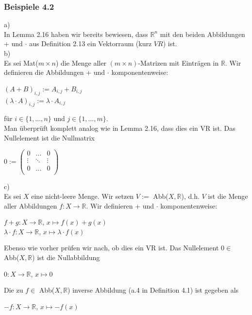 \documentclass{article}
\begin{document}
\subsubsection*{Beispiele 4.2}
a) \\
In Lemma 2.16 haben wir bereits bewiesen, dass $\mathbb{R}^n$ mit den beiden Abbildungen + und $\cdot$ aus Definition 2.13 ein Vektorraum (kurz $\textit{VR}$) ist. \\
b) \\
Es sei Mat($m \times n$) die Menge aller $(m \times n)$-Matrizen mit Einträgen in $\mathbb{R}$. Wir definieren die Abbildungen + und $\cdot$ komponentenweise: \\
\begin{center}
    $(A+B)_{i,j} := A_{i,j} + B_{i,j}$ \\
    $(\lambda \cdot A)_{i,j} := \lambda \cdot A_{i,j}$ \\
\end{center}
für $i \in \{1,...,n\}$ und $j \in \{1,...,m\}$. \\
Man überprüft komplett analog wie in Lemma 2.16, dass dies ein VR ist. Das Nullelement ist die Nullmatrix \\
\begin{center}
    $0 := \begin{pmatrix}
        0 & ... & 0 \\
        \vdots & \ddots & \vdots \\
        0 & ... & 0 \\
    \end{pmatrix}$ \\
\end{center}
c) \\
Es sei $X$ eine nicht-leere Menge. Wir setzen $V := $ Abb($X, \mathbb{R}$), d.h. $V$ ist die Menge aller Abbildungen $f: X \rightarrow \mathbb{R}$. Wir definieren + und $\cdot$ komponentenweise: \\
\begin{center}
    $f+g: X \rightarrow \mathbb{R}$, $x \mapsto f(x)+g(x)$ \\
    $\lambda \cdot f: X \rightarrow \mathbb{R}$, $x \mapsto \lambda \cdot f(x)$ \\
\end{center}
Ebenso wie vorher prüfen wir nach, ob dies ein VR ist. Das Nullelement $ 0 \in$ Abb($X, \mathbb{R}$) ist die Nullabbildung \\
\begin{center}
    $0: X \rightarrow \mathbb{R}$, $x \mapsto 0$ \\
\end{center}
Die zu $f \in$ Abb($X, \mathbb{R}$) inverse Abbildung (a.4 in Definition 4.1) ist gegeben als \\
\begin{center}
    $-f: X \rightarrow \mathbb{R}$, $x \mapsto -f(x)$ \\
\end{center}
\end{document}
